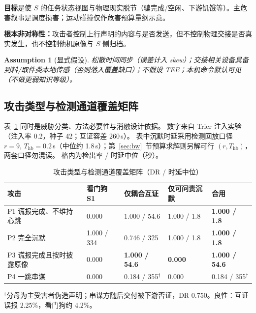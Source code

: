 \documentclass[manuscript,screen,review]{acmart}
\newtheorem{assumption}{Assumption}
\newenvironment{tablenotes}{%
    \par\footnotesize
    \begin{list}{}{%
        \setlength{\leftmargin}{1.5em}%
        \setlength{\labelsep}{0.5em}%
        \setlength{\itemsep}{0pt}%
        \setlength{\parsep}{0pt}%
    }%
}{%
    \end{list}%
}
\begin{document}
\textbf{目标}是使 $S$ 的任务状态视图与物理现实脱节（骗完成/空闲、下游饥饿等）。主危害叙事是调度损害；运动碰撞仅作危害预算量纲示意。

\textbf{根本非对称性：}攻击者控制上行声明的内容与是否发送，但不控制物理交接是否真实发生，也不控制他机原像与 $S$ 侧归档。

\begin{assumption}[显式假设]
松散时间同步（误差计入 skew）；交接相关设备具备到料/取件类本地传感（否则落入覆盖缺口）；不假设 TEE；本机命令默认可见（不做更弱知识等级）。
\end{assumption}

\subsection{攻击类型与检测通道覆盖矩阵}
\label{sec:coverage}

表~\ref{tab:coverage} 同时是威胁分类、方法必要性与消融设计依据。
数字来自 Trier 注入实验（注入率 0.2，种子 42；互证容差 260\,s）。
表中沉默时延采用检测回放口径 $r{=}9,\,T_{\mathrm{hb}}{=}0.2$\,s（中位约 1.8\,s）；第~\ref{sec:bw}~节预算求解则另解可行 $(r,T_{\mathrm{hb}})$，两套口径勿混读。
格内为检出率 / 时延中位（秒）。

\begin{table}[t]
  \centering
  \caption{攻击类型与检测通道覆盖矩阵（DR / 时延中位）}
  \label{tab:coverage}
  \begin{tabular}{@{}lllll@{}}
    \toprule
    攻击 & 看门狗 S1 & 仅耦合互证 & 仅可问责沉默 & \textbf{合用} \\
    \midrule
    P1 谎报完成、不维持心跳 & 0.000 & 1.000 / 54.6 & 1.000 / 1.8 & \textbf{1.000 / 1.8} \\
    P2 完全沉默 & 1.000 / 334 & 0.746 / 325 & 1.000 / 1.8 & \textbf{1.000 / 1.8} \\
    P3 谎报完成且按时披露原像 & 0.000 & \textbf{1.000 / 54.6} & \textbf{0.000} & \textbf{1.000 / 54.6} \\
    P4 一跳串谋 & 0.000 & 0.184 / 355$^{\dagger}$ & 0.000 & 0.184 / 355$^{\dagger}$ \\
    \bottomrule
  \end{tabular}
  \begin{tablenotes}
    \item $^{\dagger}$分母为主受害者伪造声明；串谋方随后交付被下游否证，DR $0.750$。良性：互证误报 $2.25\%$，看门狗约 $4.2\%$。
  \end{tablenotes}
\end{table}
\end{document}

